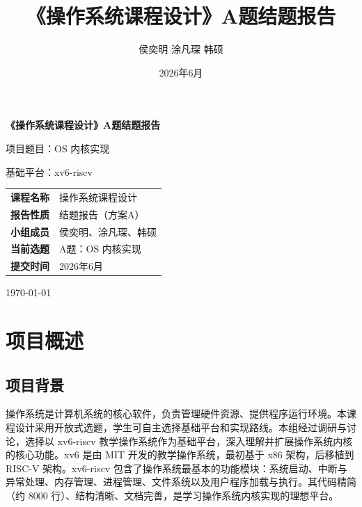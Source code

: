 \documentclass[12pt,a4paper]{ctexart}
\title{\textbf{《操作系统课程设计》A题结题报告}}
\author{侯奕明 \quad 涂凡琛 \quad 韩硕}
\date{2026年6月}
\begin{document}
\begin{titlepage}
  \centering
  \vspace*{3.5cm}

  {\bfseries 《操作系统课程设计》A题结题报告\par}
  \vspace{1.2cm}
  {项目题目：OS 内核实现\par}
  \vspace{0.6cm}
  {基础平台：xv6-riscv\par}
  \vspace{1.6cm}

  \renewcommand{\arraystretch}{1.5}
  \begin{tabular}{>{\bfseries}p{3.2cm}p{8.5cm}}
    课程名称   & 操作系统课程设计 \\
    报告性质   & 结题报告（方案A） \\
    小组成员   & 侯奕明、涂凡琛、韩硕 \\
    当前选题   & A题：OS 内核实现 \\
    提交时间   & 2026年6月 \\
  \end{tabular}

  \vfill
  {\large \today\par}
\end{titlepage}

\tableofcontents
\newpage

\section{项目概述}

\subsection{项目背景}

操作系统是计算机系统的核心软件，负责管理硬件资源、提供程序运行环境。本课程设计采用开放式选题，学生可自主选择基础平台和实现路线。本组经过调研与讨论，选择以 xv6-riscv 教学操作系统作为基础平台，深入理解并扩展操作系统内核的核心功能。xv6 是由 MIT 开发的教学操作系统，最初基于 x86 架构，后移植到 RISC-V 架构。xv6-riscv 包含了操作系统最基本的功能模块：系统启动、中断与异常处理、内存管理、进程管理、文件系统以及用户程序加载与执行。其代码精简（约 8000 行）、结构清晰、文档完善，是学习操作系统内核实现的理想平台。
\end{document}
